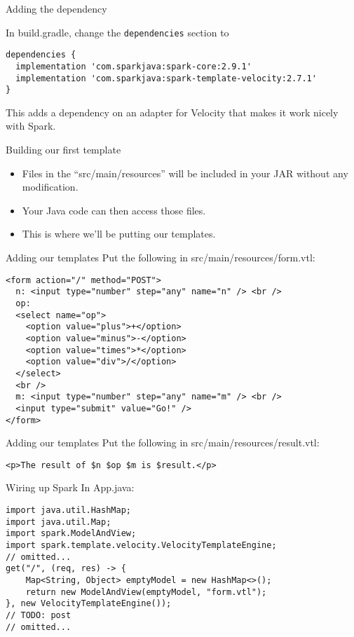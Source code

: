 \begin{frame}[fragile]{Adding the dependency}

In build.gradle, change the \texttt{dependencies} section to
\begin{verbatim}
dependencies {
  implementation 'com.sparkjava:spark-core:2.9.1'
  implementation 'com.sparkjava:spark-template-velocity:2.7.1'
}
\end{verbatim}
This adds a dependency on an adapter for Velocity that makes it work nicely with Spark.
\end{frame}

\begin{frame}{Building our first template}
\begin{itemize}
    \item Files in the ``src/main/resources'' will be included in your JAR without any modification.
    \item Your Java code can then access those files.
    \item This is where we'll be putting our templates.
\end{itemize}
\end{frame}

\begin{frame}[fragile]{Adding our templates}
Put the following in src/main/resources/form.vtl:
\begin{verbatim}
<form action="/" method="POST">
  n: <input type="number" step="any" name="n" /> <br />
  op:
  <select name="op">
    <option value="plus">+</option>
    <option value="minus">-</option>
    <option value="times">*</option>
    <option value="div">/</option>
  </select>
  <br />
  m: <input type="number" step="any" name="m" /> <br />
  <input type="submit" value="Go!" />
</form>
\end{verbatim}
\end{frame}

\begin{frame}[fragile]{Adding our templates}
Put the following in src/main/resources/result.vtl:
\begin{verbatim}
<p>The result of $n $op $m is $result.</p>
\end{verbatim}
\end{frame}

\begin{frame}[fragile]{Wiring up Spark}
In App.java:
\begin{verbatim}
import java.util.HashMap;
import java.util.Map;
import spark.ModelAndView;
import spark.template.velocity.VelocityTemplateEngine;
// omitted...
get("/", (req, res) -> {
    Map<String, Object> emptyModel = new HashMap<>();
    return new ModelAndView(emptyModel, "form.vtl");
}, new VelocityTemplateEngine());
// TODO: post
// omitted...
\end{verbatim}
\end{frame}

